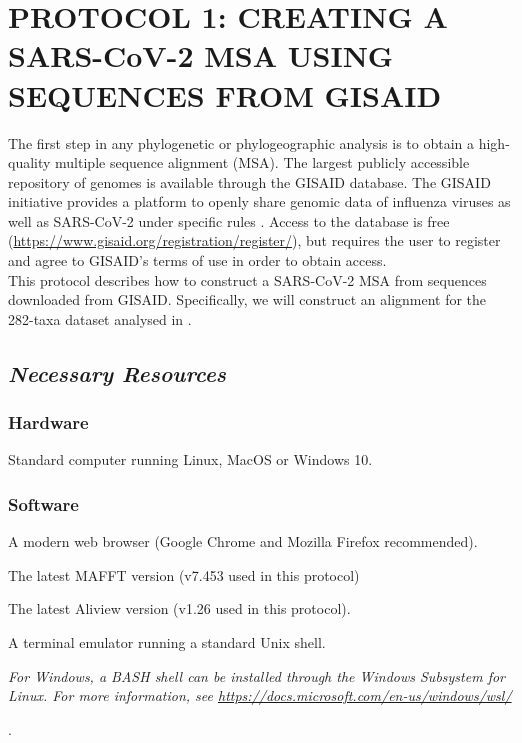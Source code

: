 \documentclass{article}
\newcommand{\ann}[1]{
\begin{adjustwidth}{0.5cm}{}
\it{#1}\\
\end{adjustwidth}}
\begin{document}
\section*{PROTOCOL 1: CREATING A SARS-CoV-2 MSA USING SEQUENCES FROM GISAID}

The first step in any phylogenetic or phylogeographic analysis is to obtain a high-quality multiple sequence alignment (MSA).
The largest publicly accessible repository of genomes is available through the GISAID database.
The GISAID initiative provides a platform to openly share genomic data of influenza viruses as well as SARS-CoV-2 under specific rules \cite{gisaid}.
Access to the database is free (\url{https://www.gisaid.org/registration/register/}), but requires the user to register and agree to GISAID's terms of use in order to obtain access.\\

This protocol describes how to construct a SARS-CoV-2 MSA from sequences downloaded from GISAID. Specifically, we will construct an alignment for the 282-taxa dataset analysed in \cite{travhist}.

\subsection*{\textbf{\textit{Necessary Resources}}}
\subsubsection*{Hardware}
\hspace{0.5cm}Standard computer running Linux, MacOS or Windows 10.

\subsubsection*{Software}
\hspace{0.5cm}A modern web browser (Google Chrome and Mozilla Firefox recommended).

\hspace{0.5cm}The latest MAFFT \cite{mafft} version (v7.453 used in this protocol)

\hspace{0.5cm}The latest Aliview \cite{aliview} version (v1.26 used in this protocol).

\hspace{0.5cm}A terminal emulator running a standard Unix shell. \\
\ann{For Windows, a BASH shell can be installed through the Windows Subsystem for Linux. For more information, see {\upshape\url{https://docs.microsoft.com/en-us/windows/wsl/}}}.
\end{document}
